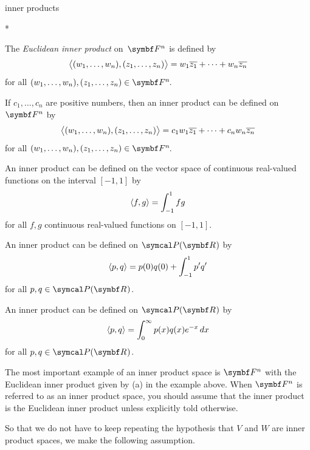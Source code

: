 \begin{example}[exampleip]{inner products}
\begin{subtheorem}*
\item
The \emph{Euclidean inner product} on~$\F{n}$ is defined by
\[
\ip[\big]{(w_1, \dots, w_n), (z_1, \dots, z_n)} =
w_1 \overline{z_1}+ \dots + w_n \overline{z_n}
\]
for all $(w_1, \dots, w_n), (z_1, \dots, z_n) \in \FF n$.

\item
If $c_1, \dots, c_n$ are positive
numbers, then an inner product can be defined on~$\F{n}$ by
\[
\ip[\big]{(w_1, \dots, w_n), (z_1, \dots, z_n)} =
c_1 w_1 \overline{z_1} + \dots + c_n w_n \overline{z_n}
\]
for all $(w_1, \dots, w_n), (z_1, \dots, z_n) \in \FF n$.

\item
An inner product can be defined on the vector space of continuous real-valued functions on the interval $[-1, 1]$ by
\[
\ip{f, g} = \int_{-1}^1fg
\]
for all $f, g$ continuous real-valued functions on $[-1,1]$.

\item
An inner product can be defined on $\P(\R{})$ by
\[
\ip{p, q} = p(0) q(0) + \int_{-1}^1 p' q'
\]
for all $p, q \in \P(\R{})$.

\item
An inner product can be defined on $\P(\R{})$ by
\[
\ip{p, q} = \int_0^\infty p(x) q(x) e^{-x} \, dx
\]
for all $p, q \in \P(\R{})$.
\end{subtheorem}
\exampleitemend
\end{example}


The most important example of an inner product space is $\F{n}$ with the Euclidean inner product given by (a) in the example above. When $\F{n}$ is referred to as an inner product space, you should assume that the inner product is the Euclidean inner product unless explicitly told otherwise.

\pagebreak[1]

So that we do not have to keep repeating the hypothesis that $V$ and $W$ are inner product spaces, we make the following assumption.



